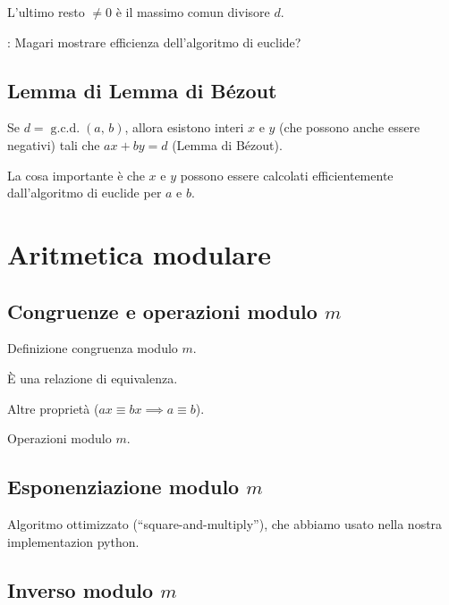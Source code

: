 \documentclass[pdflatex,11pt,a4paper,oneside]{article}
\newcommand{\XXX}[1][XXX]{\text{\bfseries{\color{red}{\emph{#1}}}}}
\newcommand{\TODO}[0]{\XXX[TODO]}
\newcommand{\congruent}[0]{\equiv}
\newcommand{\gcdop}[0]{\ensuremath{\operatorname{g.c.d.}}}
\newcommand{\xgcd}[1]{\ensuremath{\gcdop\left({#1}\right)}}
\renewcommand{\gcd}[2]{\xgcd{{#1},\,{#2}}}
\begin{document}
\noindent
L'ultimo resto $\neq 0$ \`e il massimo comun divisore $d$.

\noindent
\TODO: Magari mostrare efficienza dell'algoritmo di euclide?


\subsection{Lemma di Lemma di B\'ezout}

Se $d = \gcd{a}{b}$, allora esistono interi $x$ e $y$ (che possono 
anche essere negativi) tali che $ax + by = d$ (Lemma di B\'ezout).

La cosa importante \`e che $x$ e $y$ possono essere calcolati
efficientemente dall'algoritmo di euclide per $a$ e $b$.


\section{Aritmetica modulare}


\subsection{Congruenze e operazioni modulo $m$}

Definizione congruenza modulo $m$.

\`E una relazione di equivalenza.

Altre propriet\`a ($ax \congruent bx \implies a \congruent b$).

Operazioni modulo $m$.


\subsection{Esponenziazione modulo $m$}

Algoritmo ottimizzato (``square-and-multiply''), che abbiamo usato nella
nostra implementazion python.


\subsection{Inverso modulo $m$}
\end{document}
